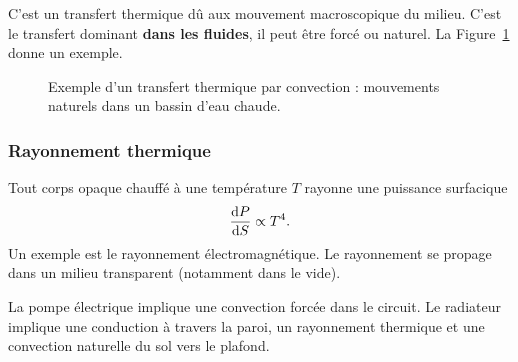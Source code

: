             C'est un transfert thermique dû aux mouvement macroscopique du milieu. C'est le transfert dominant \textbf{dans les fluides}, il peut être forcé ou naturel. La Figure~\ref{fig:exemple_transfert_thermique_convection} donne un exemple.

            \begin{figure}
                \centering
                \caption[Exemple d'un transfert thermique par convection.]{Exemple d'un transfert thermique par convection : mouvements naturels dans un bassin d'eau chaude.}
                \label{fig:exemple_transfert_thermique_convection}
            \end{figure}

        \subsubsection{Rayonnement thermique}

            Tout corps opaque chauffé à une température $T$ rayonne une puissance surfacique
            \begin{equation}
                \frac{\mathrm{d} P}{\mathrm{d} S}\propto T^{4}.
            \end{equation}
            Un exemple est le rayonnement électromagnétique. Le rayonnement se propage dans un milieu transparent (notamment dans le vide).

        \begin{example}
            La pompe électrique implique une convection forcée dans le circuit. Le radiateur implique une conduction à travers la paroi, un rayonnement thermique et une convection naturelle du sol vers le plafond.
        \end{example}

